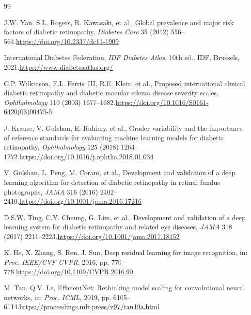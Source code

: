 \documentclass[a4paper,fleqn]{cas-dc}
\begin{document}
\begin{thebibliography}{99}

J.W. Yau, S.L. Rogers, R. Kawasaki, et al.,
Global prevalence and major risk factors of diabetic retinopathy,
\textit{Diabetes Care} 35 (2012) 556--564.\newline\url{https://doi.org/10.2337/dc11-1909}

International Diabetes Federation,
\textit{IDF Diabetes Atlas}, 10th ed.,
IDF, Brussels, 2021.\newline\url{https://www.diabetesatlas.org/}

C.P. Wilkinson, F.L. Ferris~III, R.E. Klein, et al.,
Proposed international clinical diabetic retinopathy and diabetic macular edema disease severity scales,
\textit{Ophthalmology} 110 (2003) 1677--1682.\newline\url{https://doi.org/10.1016/S0161-6420(03)00475-5}

J. Krause, V. Gulshan, E. Rahimy, et al.,
Grader variability and the importance of reference standards for evaluating machine learning models for diabetic retinopathy,
\textit{Ophthalmology} 125 (2018) 1264--1272.\newline\url{https://doi.org/10.1016/j.ophtha.2018.01.034}

V. Gulshan, L. Peng, M. Coram, et al.,
Development and validation of a deep learning algorithm for detection of diabetic retinopathy in retinal fundus photographs,
\textit{JAMA} 316 (2016) 2402--2410.\newline\url{https://doi.org/10.1001/jama.2016.17216}

D.S.W. Ting, C.Y. Cheung, G. Lim, et al.,
Development and validation of a deep learning system for diabetic retinopathy and related eye diseases,
\textit{JAMA} 318 (2017) 2211--2223.\newline\url{https://doi.org/10.1001/jama.2017.18152}

K. He, X. Zhang, S. Ren, J. Sun,
Deep residual learning for image recognition,
in: \textit{Proc. IEEE/CVF CVPR}, 2016, pp. 770--778.\newline\url{https://doi.org/10.1109/CVPR.2016.90}

M. Tan, Q.V. Le,
EfficientNet: Rethinking model scaling for convolutional neural networks,
in: \textit{Proc. ICML}, 2019, pp. 6105--6114.\newline\url{https://proceedings.mlr.press/v97/tan19a.html}


\end{thebibliography}
\end{document}
